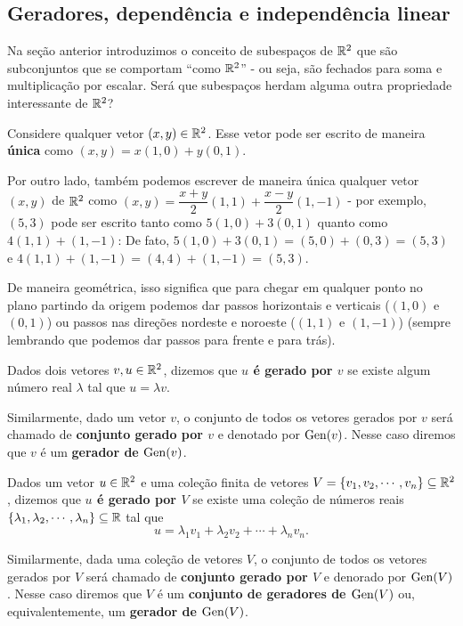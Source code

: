 \subsection{Geradores, dependência e independência linear}

Na seção anterior introduzimos o conceito de subespaços de $\mathbb R^2$ que são subconjuntos que se comportam ``como $\mathbb R^2$'' - ou seja, são fechados para soma e multiplicação por escalar. Será que subespaços herdam alguma outra propriedade interessante de $\mathbb R^2$?
\begin{ex}
	Considere qualquer vetor $(x,y)\in \mathbb R^2$. Esse vetor pode ser escrito de maneira \textbf{única} como $(x,y)=x(1,0)+y(0,1)$.
	
	Por outro lado, também podemos escrever de maneira única qualquer vetor $(x,y)$ de $\mathbb R^2$ como $(x,y)=\dfrac{x+y}{2}(1,1)+\dfrac{x-y}{2}(1,-1)$ - por exemplo, $(5,3)$ pode ser escrito tanto como $5(1,0)+3(0,1)$ quanto como $4(1,1)+(1,-1)$: De fato, $5(1,0)+3(0,1)=(5,0)+(0,3)=(5,3)$ e $4(1,1)+(1,-1)=(4,4)+(1,-1)=(5,3)$.
	
	De maneira geométrica, isso significa que para chegar em qualquer ponto no plano partindo da origem podemos dar passos horizontais e verticais ($(1,0)$ e $(0,1)$) ou passos nas direções nordeste e noroeste ($(1,1)$ e $(1,-1)$) (sempre lembrando que podemos dar passos para frente e para trás).
\end{ex}

\begin{df}
	Dados dois vetores $v,u\in\mathbb R^2$, dizemos que \textbf{$u$ é gerado por $v$} se existe algum número real $\lambda$ tal que $u=\lambda v$.
	
	Similarmente, dado um vetor $v$, o conjunto de todos os vetores gerados por $v$ será chamado de \textbf{conjunto gerado por $v$} e denotado por $\operatorname{Gen}(v)$. Nesse caso diremos que $v$ é um \textbf{gerador de $\operatorname{Gen}(v)$}.
\end{df}
\begin{df}
	Dados um vetor $u\in\mathbb R^2$ e uma coleção finita de vetores $V=\{v_1,v_2,\cdots,v_n\}\subseteq\mathbb R^2$, dizemos que \textbf{$u$ é gerado por $V$} se existe uma coleção de números reais $\{\lambda_1,\lambda_2,\cdots,\lambda_n\}\subseteq\mathbb R$ tal que
	\[u=\lambda_1v_1+\lambda_2v_2+\cdots+\lambda_nv_n.\]
	
	Similarmente, dada uma coleção de vetores $V$, o conjunto de todos os vetores gerados por $V$ será chamado de \textbf{conjunto gerado por $V$} e denorado por $\operatorname{Gen}(V)$. Nesse caso diremos que $V$ é um \textbf{conjunto de geradores de $\operatorname{Gen}(V)$} ou, equivalentemente, um \textbf{gerador de $\operatorname{Gen}(V)$}.
\end{df}

